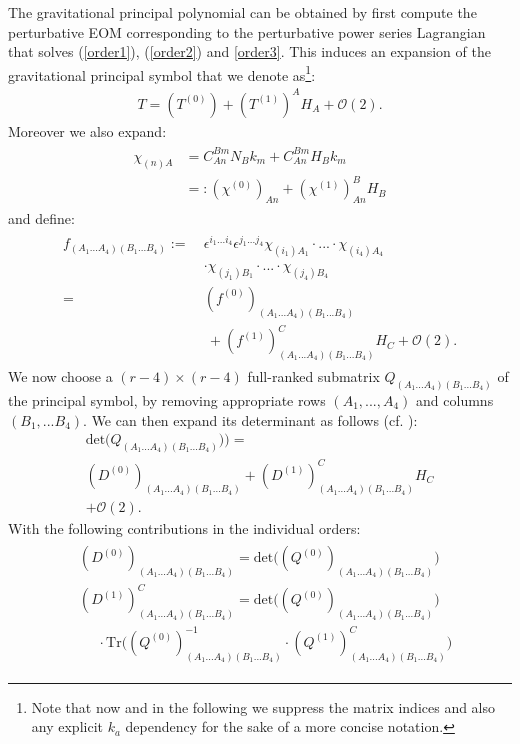 \documentclass[%
 reprint,
nofootinbib,
 amsmath,amssymb,
 aps,
 prd,
floatfix,
]{revtex4-2}
\begin{document}
The gravitational principal polynomial can be obtained by first compute the perturbative EOM corresponding to the perturbative power series Lagrangian that solves (\ref{order1}), (\ref{order2}) and \ref{order3}. This induces an expansion of the gravitational principal symbol that we denote as\footnote{Note that now and in the following we suppress the matrix indices and also any explicit $k_a$ dependency for the sake of a more concise notation.}:
\begin{align}
    T = (T^{(0)}) + (T^{(1)})^AH_A + \mathcal{O}(2).
\end{align}
Moreover we also expand:
\begin{align}
\begin{aligned}
\chi_{(n)A} &=  C^{Bm}_{An} N_B k_m + C^{Bm}_{An} H_B k_m\\
&=: (\chi^{(0)})_{An} + (\chi^{(1)})^B_{An}H_B
\end{aligned}
\end{align}
and define:
\begin{align}\label{PreF}
\begin{aligned}
f_{(A_1...A_4)(B_1...B_4)} := \  &\epsilon^{i_1...i_4} \epsilon^{j_1...j_4} \chi_{(i_1)A_1} \cdot ... \cdot \chi_{(i_4)A_4}\\
&\cdot \chi_{(j_1)B_1} \cdot ... \cdot \chi_{(j_4)B_4}\\
 = \ &(f^{(0)})_{(A_1...A_4)(B_1...B_4)}\\
 & \  + (f^{(1)})^C_{(A_1...A_4)(B_1...B_4)}H_C + \mathcal{O}(2).
\end{aligned}
\end{align}
We now choose a $(r-4) \times (r-4)$ full-ranked submatrix $Q_{(A_1...A_4)(B_1...B_4)}$ of the principal symbol, by removing appropriate rows $(A_1,...,A_4)$ and columns $(B_1,...B_4)$. We can then expand its determinant as follows (cf. \cite{IMM2012-03274}):
\begin{multline}
    \mathrm{det}\bigl(Q_{(A_1...A_4)(B_1...B_4)})\bigr) =\\
    (D^{(0)})_{(A_1...A_4)(B_1...B_4)} + (D^{(1)})^C_{(A_1...A_4)(B_1...B_4)}H_C\\
    + \mathcal{O}(2).
\end{multline}
With the following contributions in the individual orders:
\begin{align}\label{polyMatrices}
\begin{aligned}
  &(D^{(0)})_{(A_1...A_4)(B_1...B_4)} =  \mathrm{det}\bigl((Q^{(0)})_{(A_1...A_4)(B_1...B_4)}\bigr) \\
  &(D^{(1)})^C_{(A_1...A_4)(B_1...B_4)} = \mathrm{det}\bigl((Q^{(0)})_{(A_1...A_4)(B_1...B_4)}\bigr) \\
 & \ \ \ \ \ \ \cdot \mathrm{Tr} \bigl ( (Q^{(0)})^{-1}_{(A_1...A_4)(B_1...B_4)} 
   \cdot (Q^{(1)})_{(A_1...A_4)(B_1...B_4)}^C \bigr) 
\end{aligned}
\end{align} 
\end{document}
